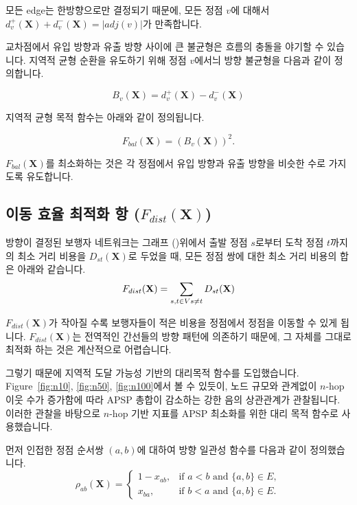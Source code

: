 \documentclass[11pt,a4paper]{article}
\begin{document}
모든 edge는 한방향으로만 결정되기 때문에, 모든 정점 $v$에 대해서 $d_v^+ (\mathbf{X}) + d_v^- (\mathbf{X}) = |adj(v)|$가 만족합니다.

교차점에서 유입 방향과 유출 방향 사이에 큰 불균형은 흐름의 충돌을 야기할 수 있습니다. 지역적 균형 순환을 유도하기 위해 정점 $v$에서늬 방향 불균형을 다음과 같이 정의합니다.

\begin{equation}
B_v(\mathbf{X}) = d_v^+ (\mathbf{X}) - d_v^- (\mathbf{X})
\end{equation}

지역적 균형 목적 함수는 아래와 같이 정의됩니다.

\begin{equation}
F_{bal}(\mathbf{X}) = (B_v(\mathbf{X}))^2.
\end{equation}

$F_{bal}(\mathbf{X})$를 최소화하는 것은 각 정점에서 유입 방향과 유출 방향을 비슷한 수로 가지도록 유도합니다.

\subsection{이동 효율 최적화 항 ($F_{dist}(\mathbf{X})$)}
방향이 결정된 보행자 네트워크는
그래프 ()위에서 출발 정점 $s$로부터 도착 정점 $t$까지의 최소 거리 비용을 $D_{st}(\mathbf{X})$로 두었을 때, 모든 정점 쌍에 대한 최소 거리 비용의 합은 아래와 같습니다.
\begin{equation}
F_{dist}(\mathbf{X}) = \sum_{s, t \in V \\ s \neq t} D_{st}(\mathbf{X})
\end{equation}


$F_{dist}(\mathbf{X})$가 작아질 수록 보행자들이 적은 비용을  정점에서 정점을 이동할 수 있게 됩니다.
$F_{dist}(\mathbf{X})$는 전역적인 간선들의 방향 패턴에 의존하기 때문에, 그 자체를 그대로 최적화 하는 것은 계산적으로 어렵습니다.

그렇기 때문에 지역적 도달 가능성 기반의 대리목적 함수를 도입했습니다.
Figure~\ref{fig:n10}, \ref{fig:n50}, \ref{fig:n100}에서 볼 수 있듯이,
노드 규모와 관계없이 $n$-hop 이웃 수가 증가함에 따라
APSP 총합이 감소하는 강한 음의 상관관계가 관찰됩니다. 이러한 관찰을 바탕으로 $n$-hop 기반 지표를 APSP 최소화를 위한 대리 목적 함수로 사용했습니다.

먼저 인접한 정점 순서쌍 $(a, b)$에 대하여 방향 일관성 함수를 다음과 같이 정의했습니다.
\begin{equation}
    \rho_{ab}(\mathbf{X})
    =
    \begin{cases}
    1-x_{ab}, & \text{if } a<b \text{ and } \{a,b\}\in E,\\
    x_{ba}, & \text{if } b<a \text{ and } \{a,b\}\in E.
    \end{cases}
\end{equation}
\end{document}
